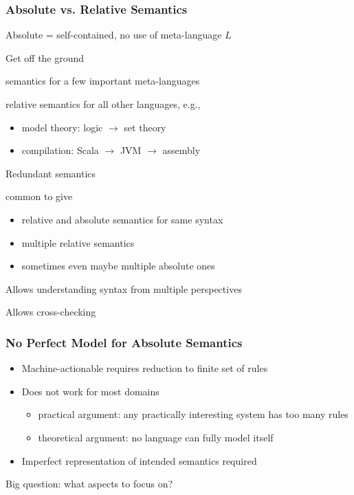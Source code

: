 \begin{frame}\frametitle{Absolute vs. Relative Semantics}
Absolute = self-contained, no use of meta-language $L$

\begin{blockitems}{Get off the ground}
 \item semantics for a few important meta-languages
 \item relative semantics for all other languages, e.g.,
  \begin{itemize}
  \item model theory: logic $\to$ set theory
  \item compilation: Scala $\to$ JVM $\to$ assembly
  \end{itemize}
\end{blockitems}

\begin{blockitems}{Redundant semantics}
 \item common to give
 \begin{itemize}
  \item relative and absolute semantics for same syntax
  \item multiple relative semantics
  \item sometimes even maybe multiple absolute ones
 \end{itemize}
 \item Allows understanding syntax from multiple perspectives
 \item Allows cross-checking 
\end{blockitems}
\end{frame}

\begin{frame}\frametitle{No Perfect Model for Absolute Semantics}
\begin{itemize}
\item Machine-actionable requires reduction to finite set of rules
\item Does not work for most domains
 \begin{itemize}
 \item practical argument: any practically interesting system has too many rules
 \item theoretical argument: no language can fully model itself
 \end{itemize}
\item Imperfect representation of intended semantics required
\end{itemize}

Big question: what aspects to focus on?
\end{frame}

